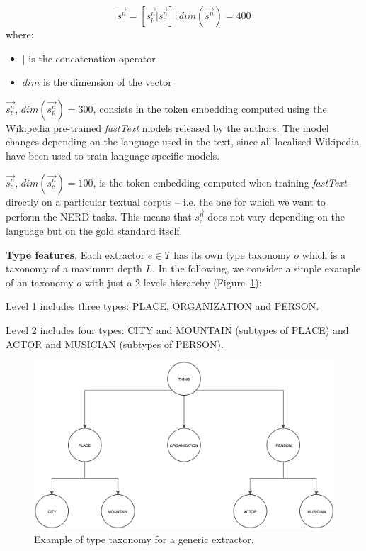\documentclass{llncs}
\newcommand{\figref}[1]{\mbox{Figure~\ref{#1}}}
\begin{document}
\begin{equation}
\vec{s^{n}} = \left [  \vec{s^{n}_p}|\vec{s^{n}_c} \right ], dim(\vec{s^{n}})=400
\end{equation}
where: 
\begin{itemize}
    \item[] $|$ is the concatenation operator
    \item[] $dim$ is the dimension of the vector
\end{itemize}

$\vec{s^{n}_p}$, $dim(\vec{s^{n}_p})=300$, consists in the token embedding computed using the Wikipedia pre-trained \textit{fastText} models released by the authors. The model changes depending on the language used in the text, since all localised Wikipedia have been used to train language specific models.

$\vec{s^{n}_c}$, $dim(\vec{s^{n}_c})=100$, is the token embedding computed when training \textit{fastText} directly on a particular textual corpus -- i.e. the one for which we want to perform the NERD tasks. This means that $\vec{s^{n}_c}$ does not vary depending on the language but on the gold standard itself.

\textbf{Type features}. Each extractor $e \in T$ has its own type taxonomy $o$ which is a taxonomy of a maximum depth $L$. In the following, we consider a simple example of an taxonomy $o$ with just a 2 levels hierarchy (\figref{fig:ontology}):
\begin{enumerate}
\begin{item}
Level 1 includes three types: PLACE, ORGANIZATION and PERSON.
\end{item}
\begin{item}
Level 2 includes four types: CITY and MOUNTAIN (subtypes of PLACE) and ACTOR and MUSICIAN (subtypes of PERSON). 
\end{item}
\end{enumerate}

\begin{figure}
	\centering
    \includegraphics[scale=0.23]{onotlogy.png}
 	\caption{Example of type taxonomy for a generic extractor.}
 	\label{fig:ontology}
\end{figure}
\end{document}
